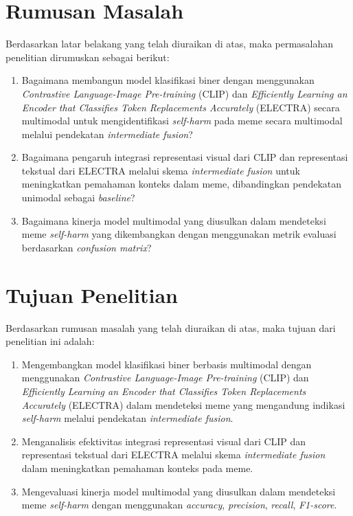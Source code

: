 \section{Rumusan Masalah} \label{I.Rumusan Masalah}

Berdasarkan latar belakang yang telah diuraikan di atas, maka permasalahan penelitian dirumuskan sebagai berikut: \par
\begin{enumerate}
    \item Bagaimana membangun model klasifikasi biner dengan menggunakan \textit{Contrastive Language-Image Pre-training} (CLIP) dan \textit{Efficiently Learning an Encoder that Classifies Token Replacements Accurately} (ELECTRA) secara multimodal untuk mengidentifikasi \textit{self-harm} pada meme secara multimodal melalui pendekatan \textit{intermediate fusion}?
    \item Bagaimana pengaruh integrasi representasi visual dari CLIP dan representasi tekstual dari ELECTRA melalui skema \textit{intermediate fusion} untuk meningkatkan pemahaman konteks dalam meme, dibandingkan pendekatan unimodal sebagai \textit{baseline}?
    \item Bagaimana kinerja model multimodal yang diusulkan dalam mendeteksi meme \textit{self-harm} yang dikembangkan dengan menggunakan metrik evaluasi berdasarkan \textit{confusion matrix}?
\end{enumerate}


\section{Tujuan Penelitian} \label{I.Tujuan}
Berdasarkan rumusan masalah yang telah diuraikan di atas, maka tujuan dari penelitian ini adalah: \par

\begin{enumerate}
    \item Mengembangkan model klasifikasi biner berbasis multimodal dengan menggunakan \textit{Contrastive Language-Image Pre-training} (CLIP) dan \textit{Efficiently Learning an Encoder that Classifies Token Replacements Accurately} (ELECTRA) dalam mendeteksi meme yang mengandung indikasi \textit{self-harm} melalui pendekatan \textit{intermediate fusion}.
    \item Menganalisis efektivitas integrasi representasi visual dari CLIP dan representasi tekstual dari ELECTRA melalui skema \textit{intermediate fusion} dalam meningkatkan pemahaman konteks pada meme.
    \item Mengevaluasi kinerja model multimodal yang diusulkan dalam mendeteksi meme \textit{self-harm} dengan menggunakan \textit{accuracy}, \textit{precision}, \textit{recall}, \textit{F1-score}.
\end{enumerate}


